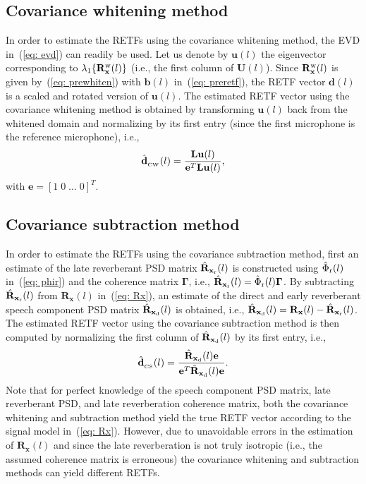 \documentclass{article}
\begin{document}
\subsection{Covariance whitening method} 
In order to estimate the RETFs using the covariance whitening method, the EVD in~(\ref{eq: evd}) can readily be used.
Let us denote by $\mathbf{u}(l)$ the eigenvector corresponding to $\lambda_{1}\{\mathbf{R}^{\rm w}_{\mathbf{x}}(l) \}$ (i.e., the first column of $\mathbf{U}(l)$).
Since $\mathbf{R}^{\rm w}_{\mathbf{x}}(l)$ is given by~(\ref{eq: prewhiten}) with $\mathbf{b}(l)$ in~(\ref{eq: preretf}), the RETF vector $\mathbf{d}(l)$ is a scaled and rotated version of $\mathbf{u}(l)$.
The estimated RETF vector using the covariance whitening method is obtained by transforming $\mathbf{u}(l)$ back from the whitened domain and normalizing by its first entry (since the first microphone is the reference microphone), i.e.,
\begin{equation}
 \hat{\mathbf{d}}_{_{\rm {CW}}}(l) = \frac{\mathbf{L}\mathbf{u}(l)}{\mathbf{e}^T\mathbf{L}\mathbf{u}(l)},
\end{equation}
with $\mathbf{e} = [1 \; 0 \; \ldots \; 0]^T$.

\subsection{Covariance subtraction method} 
In order to estimate the RETFs using the covariance subtraction method, first an estimate of the late reverberant PSD matrix $\hat{\mathbf{R}}_{\mathbf{x}_{\rm r}}(l)$ is constructed using $\hat{\Phi}_{\rm r}(l)$ in~(\ref{eq: phir}) and the coherence matrix $\boldsymbol{\Gamma}$, i.e., $\hat{\mathbf{R}}_{\mathbf{x}_{\rm r}}(l) = \hat{\Phi}_{\rm r}(l) \boldsymbol{\Gamma}$. 
By subtracting $\hat{\mathbf{R}}_{\mathbf{x}_{\rm r}}(l)$ from $\mathbf{R}_{\mathbf{x}}(l)$ in~(\ref{eq: Rx}), an estimate of the direct and early reverberant speech component PSD matrix $\hat{\mathbf{R}}_{\mathbf{x}_{\rm d}}(l)$ is obtained, i.e., $\hat{\mathbf{R}}_{\mathbf{x}_{\rm d}}(l) = \mathbf{R}_{\mathbf{x}}(l) -   \hat{\mathbf{R}}_{\mathbf{x}_{\rm r}}(l)$.
The estimated RETF vector using the covariance subtraction method is then computed by normalizing the first column of $\hat{\mathbf{R}}_{\mathbf{x}_{\rm d}}(l)$ by its first entry, i.e.,
\begin{equation}
  \label{eq: sub}
  \hat{\mathbf{d}}_{_{\rm CS}}(l) = \frac{  \hat{\mathbf{R}}_{\mathbf{x}_{\rm d}}(l) \mathbf{e}}{\mathbf{e}^T  \hat{\mathbf{R}}_{\mathbf{x}_{\rm d}}(l) \mathbf{e}}.
\end{equation}
Note that for perfect knowledge of the speech component PSD matrix, late reverberant PSD, and late reverberation coherence matrix, both the covariance whitening and subtraction method yield the true RETF vector according to the signal model in~(\ref{eq: Rx}).
However, due to unavoidable errors in the estimation of $\mathbf{R}_{\mathbf{x}}(l)$ and since the late reverberation is not truly isotropic (i.e., the assumed coherence matrix is erroneous) the covariance whitening and subtraction methods can yield different RETFs.
\end{document}
